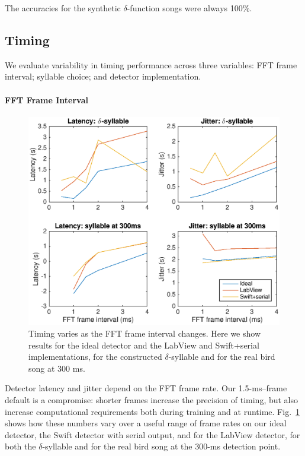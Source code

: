 \documentclass[10pt,letterpaper]{article}
\newcommand\fig[1]{Fig.~\ref{#1}}
\renewcommand{\subsubsection}[1]{\paragraph{#1}}
\begin{document}
The accuracies for the synthetic $\delta$-function songs were always 100\%.

\subsection{Timing}

We evaluate variability in timing performance across three variables: FFT frame interval; syllable choice; and detector implementation.

\subsubsection{FFT Frame Interval}

\begin{figure}
  \includegraphics[width=\textwidth]{TimingVsFrame}
  \caption{Timing varies as the FFT frame interval changes.  Here we show results for the ideal detector and the LabView and Swift+serial implementations, for the constructed $\delta$-syllable and for the real bird song at 300 ms.}
  \label{fig:TimingVsFrame}
\end{figure}

Detector latency and jitter depend on the FFT frame rate.  Our 1.5-ms--frame default is a compromise: shorter frames increase the precision of timing, but also increase computational requirements both during training and at runtime.  \fig{fig:TimingVsFrame} shows how these numbers vary over a useful range of frame rates on our ideal detector, the Swift detector with serial output, and for the LabView detector, for both the $\delta$-syllable and for the real bird song at the 300-ms detection point.
\end{document}
